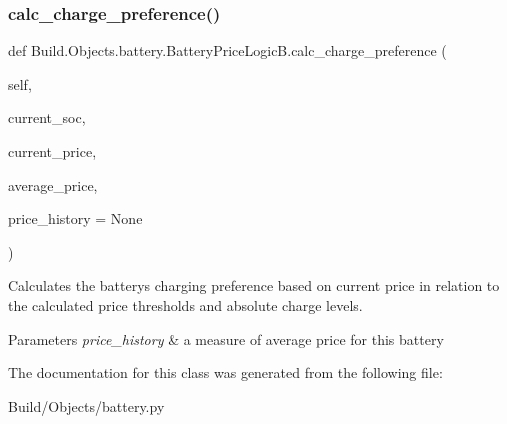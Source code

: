 \subsubsection{\texorpdfstring{calc\+\_\+charge\+\_\+preference()}{calc\_charge\_preference()}}
{\footnotesize\ttfamily def Build.\+Objects.\+battery.\+Battery\+Price\+Logic\+B.\+calc\+\_\+charge\+\_\+preference (\begin{DoxyParamCaption}\item[{}]{self,  }\item[{}]{current\+\_\+soc,  }\item[{}]{current\+\_\+price,  }\item[{}]{average\+\_\+price,  }\item[{}]{price\+\_\+history = {\ttfamily None} }\end{DoxyParamCaption})}



Calculates the battery\textquotesingle{}s charging preference based on current price in relation to the calculated price thresholds and absolute charge levels. 


\begin{DoxyParams}{Parameters}
{\em price\+\_\+history} & a measure of average price for this battery \\
\hline
\end{DoxyParams}


The documentation for this class was generated from the following file\+:\begin{DoxyCompactItemize}
\item 
Build/\+Objects/battery.\+py\end{DoxyCompactItemize}
